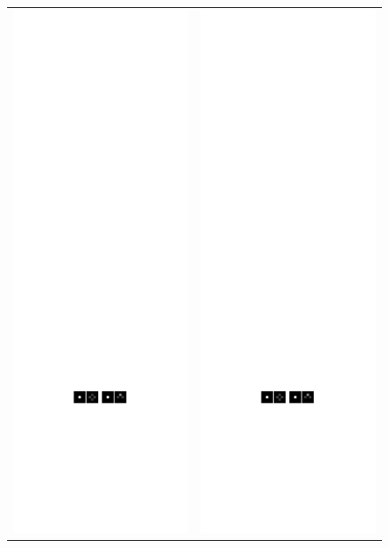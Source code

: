 \documentclass[letterpaper]{article} %
\begin{document}
\begin{figure}
\centering
\begin{tabular}{cc}
\includegraphics[width=0.4\columnwidth]{deter-2-1}
&
\includegraphics[width=0.4\columnwidth]{deter-2-2}

\end{tabular}
\end{figure}
\end{document}
